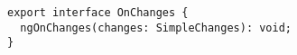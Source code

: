 \begin{verbatim}
export interface OnChanges {
  ngOnChanges(changes: SimpleChanges): void;
}
\end{verbatim}
